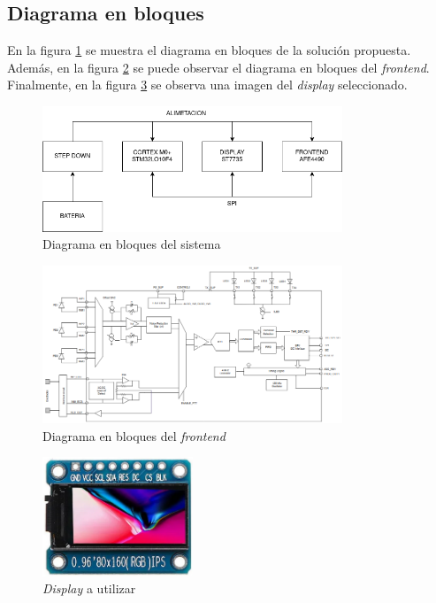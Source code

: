 \documentclass[
    11pt,
    spanish,
	a4paper
]{article}
\begin{document}
\subsection{Diagrama en bloques}
\label{subsec:bloques}

En la figura \ref{fig:bloques} se muestra el diagrama en bloques de la solución propuesta. 
Además, en la figura \ref{fig:frontend} se puede observar el diagrama en bloques del \emph{frontend}.
Finalmente, en la figura \ref{fig:display} se observa una imagen del \emph{display} seleccionado.
\begin{figure}[h!]
    \centering
    \includegraphics[width=0.8\textwidth]{img/bloques.png}
    \caption{Diagrama en bloques del sistema}
    \label{fig:bloques}
\end{figure}

\begin{figure}[h!]
    \centering
    \includegraphics[width=0.8\textwidth]{img/frontend.png}
    \caption{Diagrama en bloques del \emph{frontend}}
    \label{fig:frontend}
\end{figure}

\begin{figure}[h!]
    \centering
    \includegraphics[width=0.4\textwidth]{img/display.png}
    \caption{\emph{Display} a utilizar}
    \label{fig:display}
\end{figure}
\end{document}
